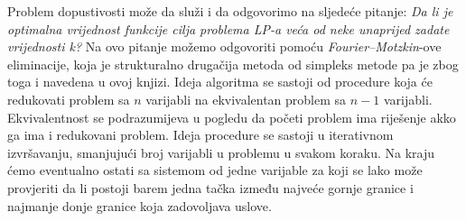 \documentclass[a4paper, utf8, 11pt, colorlinks]{book}
\begin{document}
Problem dopustivosti može da služi i da odgovorimo na sljedeće pitanje: 
\emph{Da li je optimalna vrijednost funkcije cilja problema LP-a veća od neke unaprijed zadate  vrijednosti k?}
 Na ovo pitanje možemo odgovoriti pomoću \emph{Fourier–Motzkin}-ove eliminacije, koja je strukturalno drugačija metoda od simpleks metode pa je zbog toga i navedena u ovoj knjizi. Ideja algoritma se sastoji od procedure koja će redukovati problem sa $n$ varijabli na ekvivalentan problem sa $n-1$ varijabli. Ekvivalentnost se podrazumijeva u pogledu da početi problem ima riješenje akko  ga ima i redukovani problem. Ideja procedure se sastoji u iterativnom izvršavanju, smanjujući broj varijabli u problemu u svakom koraku. Na kraju ćemo eventualno ostati sa sistemom od jedne varijable za koji se lako može provjeriti da li postoji barem jedna tačka između najveće gornje granice i najmanje donje granice koja zadovoljava  uslove. 
 
\end{document}
